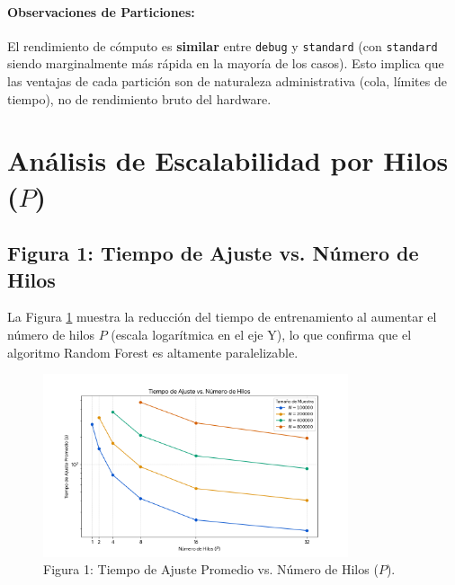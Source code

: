 \documentclass{article}
\begin{document}
\paragraph{Observaciones de Particiones:}
El rendimiento de cómputo es \textbf{similar} entre \texttt{debug} y \texttt{standard} (con \texttt{standard} siendo marginalmente más rápida en la mayoría de los casos). Esto implica que las ventajas de cada partición son de naturaleza administrativa (cola, límites de tiempo), no de rendimiento bruto del hardware.

\section{Análisis de Escalabilidad por Hilos ($P$)}

\subsection{Figura 1: Tiempo de Ajuste vs. Número de Hilos}

La Figura \ref{fig:tiempo_ajuste} muestra la reducción del tiempo de entrenamiento al aumentar el número de hilos $P$ (escala logarítmica en el eje Y), lo que confirma que el algoritmo Random Forest es altamente paralelizable.

\begin{figure}[H]
    \centering
    \includegraphics[width=0.8\textwidth]{fit_time_vs_n_samples_p32.png}
    \caption{Figura 1: Tiempo de Ajuste Promedio vs. Número de Hilos ($P$).}
    \label{fig:tiempo_ajuste}
\end{figure}
\end{document}
